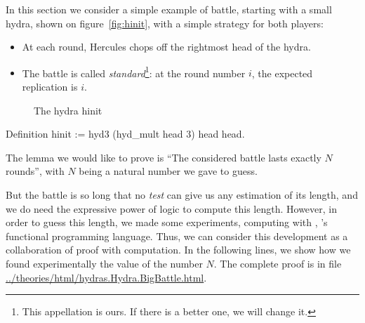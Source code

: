 In this section we consider a simple example of battle, starting with a small hydra,
shown on figure~\vref{fig:hinit}, with a simple strategy for both players:

\begin{itemize}
\item At each round, Hercules chops off the rightmost head of the hydra.
\item The battle is called \emph{standard}\footnote{This appellation is ours. If there is a better one, we will change it.}: at the round number $i$, the expected replication is $i$.
\end{itemize}



\begin{figure}[h]
  \centering

  \caption{The hydra hinit}
  \label{fig:hinit}
\end{figure}


\begin{Coqsrc}
Definition hinit := hyd3 (hyd_mult head 3)  head head.  
\end{Coqsrc}



The lemma we would like to prove is ``The considered battle lasts exactly $N$ rounds'',
with $N$ being a natural number we gave to guess.

But the  battle is so long that no \emph{test} can give us any estimation of its length, and we do need the expressive power of logic to compute this length. However, in order to  guess this length, we made some experiments, computing with \gallina{}, \coq{}'s  functional programming language.
Thus, we can consider this development as a collaboration of proof with computation.
In the following lines, we show how we found experimentally the value of the number $N$.
The complete proof is in file \url{../theories/html/hydras.Hydra.BigBattle.html}. 


